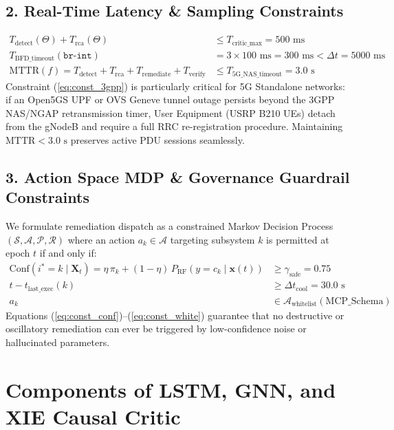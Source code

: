\subsection*{2. Real-Time Latency \& Sampling Constraints}
\begin{align}
T_{\text{detect}}(\Theta) + T_{\text{rca}}(\Theta) &\le T_{\text{critic\_max}} = 500\text{ ms} \label{eq:const_critic} \\
T_{\text{BFD\_timeout}}(\texttt{br-int}) &= 3 \times 100\text{ ms} = 300\text{ ms} < \Delta t = 5000\text{ ms} \label{eq:const_bfd} \\
\text{MTTR}(f) = T_{\text{detect}} + T_{\text{rca}} + T_{\text{remediate}} + T_{\text{verify}} &\le T_{\text{5G\_NAS\_timeout}} = 3.0\text{ s} \label{eq:const_3gpp}
\end{align}
Constraint (\ref{eq:const_3gpp}) is particularly critical for 5G Standalone networks: if an Open5GS UPF or OVS Geneve tunnel outage persists beyond the 3GPP NAS/NGAP retransmission timer, User Equipment (USRP B210 UEs) detach from the gNodeB and require a full RRC re-registration procedure. Maintaining $\text{MTTR} < 3.0\text{ s}$ preserves active PDU sessions seamlessly.

\subsection*{3. Action Space MDP \& Governance Guardrail Constraints}
We formulate remediation dispatch as a constrained Markov Decision Process $(\mathcal{S}, \mathcal{A}, \mathcal{P}, \mathcal{R})$ where an action $a_k \in \mathcal{A}$ targeting subsystem $k$ is permitted at epoch $t$ if and only if:
\begin{align}
\text{Conf}(i^* = k \mid \mathbf{X}_t) = \eta \, \pi_k + (1 - \eta) \, P_{\text{RF}}(y = c_k \mid \mathbf{x}(t)) &\ge \gamma_{\text{safe}} = 0.75 \label{eq:const_conf} \\
t - t_{\text{last\_exec}}(k) &\ge \Delta t_{\text{cool}} = 30.0\text{ s} \label{eq:const_cool} \\
a_k &\in \mathcal{A}_{\text{whitelist}}(\text{MCP\_Schema}) \label{eq:const_white}
\end{align}
Equations (\ref{eq:const_conf})--(\ref{eq:const_white}) guarantee that no destructive or oscillatory remediation can ever be triggered by low-confidence noise or hallucinated parameters.

\section{Components of LSTM, GNN, and XIE Causal Critic}

